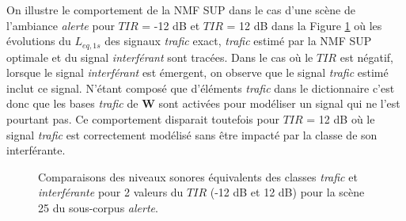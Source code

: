 On illustre le comportement de la NMF SUP dans le cas d'une scène de l'ambiance \textit{alerte} pour $TIR$ = -12 dB et $TIR$ = 12 dB dans la Figure \ref{fig:Lp_alert} où les évolutions du $L_{eq,1s}$ des signaux \textit{trafic} exact, \textit{trafic} estimé par la NMF SUP optimale et du signal \textit{interférant} sont tracées. Dans le cas où le $TIR$ est négatif, lorsque le signal \textit{interférant} est émergent, on observe que le signal \textit{trafic} estimé inclut ce signal. N'étant composé que d'éléments \textit{trafic} dans le dictionnaire c'est donc que les bases \textit{trafic} de $\mathbf{W}$ sont activées pour modéliser un signal qui ne l'est pourtant pas. Ce comportement disparait toutefois pour $TIR$ = 12 dB où le signal \textit{trafic} est correctement modélisé sans être impacté par la classe de son interférante.

\begin{figure}[h!]%
\centering
{}%
\qquad
{}%
\caption{Comparaisons des niveaux sonores équivalents des classes \textit{trafic} et \textit{interférante} pour 2 valeurs du $TIR$ (-12 dB et 12 dB) pour la scène 25 du sous-corpus \textit{alerte}.}
\label{fig:Lp_alert}
\end{figure}

